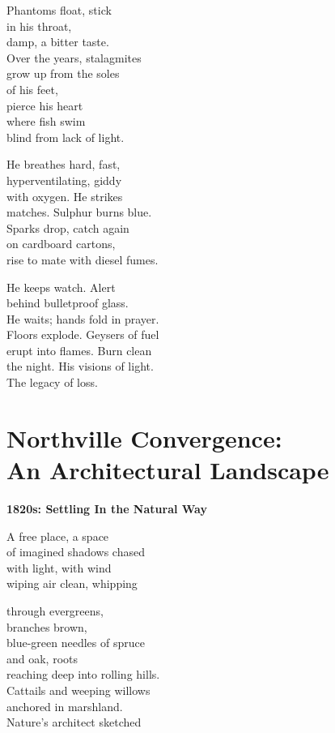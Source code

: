 \documentclass[twoside,10pt]{book}
\begin{document}
Phantoms float, stick\\
in his throat,\\
damp, a bitter taste.\\
Over the years, stalagmites\\
grow up from the soles\\
of his feet,\\
pierce his heart\\
where fish swim\\
blind from lack of light.

He breathes hard, fast,\\
hyperventilating, giddy\\
with oxygen. He strikes\\
matches. Sulphur burns blue.\\
Sparks drop, catch again\\
on cardboard cartons,\\
rise to mate with diesel fumes.

He keeps watch. Alert\\
behind bulletproof glass.\\
He waits; hands fold in prayer.\\
Floors explode. Geysers of fuel\\
erupt into flames. Burn clean\\
the night. His visions of light.\\
The legacy of loss.


\clearpage
\section{Northville Convergence:\\
  An Architectural Landscape}

{\bf 1820s: Settling In the Natural Way}

A free place, a space\\
of imagined shadows chased\\
with light, with wind\\
wiping air clean, whipping

through evergreens,\\
branches brown,\\
blue-green needles of spruce\\
and oak, roots\\
reaching deep into rolling hills.\\
Cattails and weeping willows\\
anchored in marshland.\\
Nature's architect sketched
\end{document}
